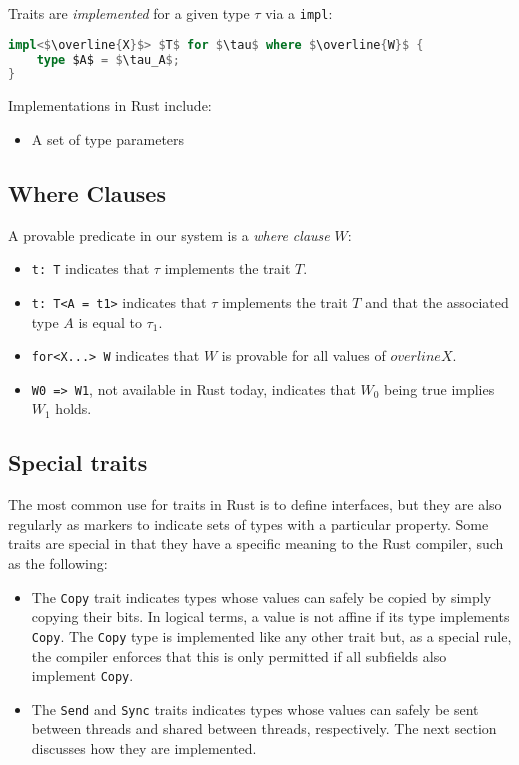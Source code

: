 \documentclass[sn-mathphys-num]{sn-jnl}%
\newcommand{\code}[1]{{\tt #1}}
\theoremstyle{thmstyleone}%
\theoremstyle{thmstyletwo}%
\theoremstyle{thmstylethree}%
\begin{document}
Traits are \emph{implemented} for a given type $\tau$ via a \code{impl}:

\begin{lstlisting}[language=Rust, mathescape=true]
impl<$\overline{X}$> $T$ for $\tau$ where $\overline{W}$ {
    type $A$ = $\tau_A$;
}
\end{lstlisting}

Implementations in Rust include:

\begin{itemize}
    \item A set of type parameters 
\end{itemize}
    
\subsection{Where Clauses}

A provable predicate in our system is a \emph{where clause} $W$:

\begin{itemize}
    \item \code{t: T} indicates that $\tau$ implements the trait $T$.
    \item \code{t: T<A = t1>} indicates that $\tau$ implements the trait $T$ and that the associated type $A$ is equal to $\tau_1$.
    \item \code{for<X...> W} indicates that $W$ is provable for all values of $overline{X}$.
    \item \code{W0 => W1}, not available in Rust today, indicates that $W_0$ being true implies $W_1$ holds.
\end{itemize}

\subsection{Special traits}

The most common use for traits in Rust is to define interfaces,
but they are also regularly as markers to indicate sets of types with a particular property.
Some traits are special in that they have a specific meaning to the Rust compiler,
such as the following:

\begin{itemize}
    \item The \code{Copy} trait indicates types whose values can safely be copied by simply copying their bits.
    In logical terms, a value is not affine if its type implements \code{Copy}.
    The \code{Copy} type is implemented like any other trait but, as a special rule,
    the compiler enforces that this is only permitted if all subfields also implement \code{Copy}.
    \item The \code{Send} and \code{Sync} traits indicates types whose values can safely be sent between threads
    and shared between threads, respectively. 
    The next section discusses how they are implemented.
\end{itemize}
\end{document}
